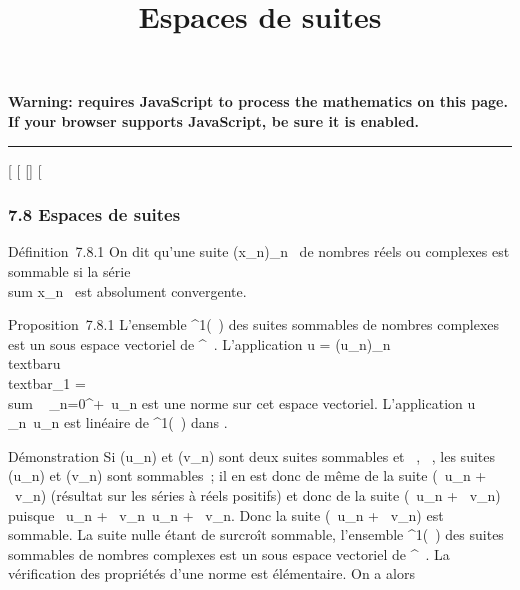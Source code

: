 \documentclass[]{article}
\title{Espaces de suites}
\author{}
\date{}
\begin{document}
\maketitle

\textbf{Warning: 
requires JavaScript to process the mathematics on this page.\\ If your
browser supports JavaScript, be sure it is enabled.}

\begin{center}\rule{3in}{0.4pt}\end{center}

{[}
{[}
{[}{]}
{[}

\subsubsection{7.8 Espaces de suites}

Définition~7.8.1 On dit qu'une suite (x\_n)\_n\in{}~ de
nombres réels ou complexes est sommable si la série
\\sum  x\_n~ est
absolument convergente.

Proposition~7.8.1 L'ensemble \ell^1(~) des suites sommables de
nombres complexes est un sous espace vectoriel de ^~.
L'application u =
(u\_n)\_n\in{}~\mapsto~\\textbar{}u\\textbar{}\_1
= \\sum ~
\_n=0^+\infty~\textbar{}u\_n\textbar{} est une norme sur
cet espace vectoriel. L'application
u\mapsto~\\\sum
 \_n\in{}~u\_n est linéaire de \ell^1(~) dans .

Démonstration Si (u\_n) et (v\_n) sont deux suites
sommables et \alpha~,\beta~ \in {}, les suites (\textbar{}u\_n\textbar{}) et
(\textbar{}v\_n\textbar{}) sont sommables~; il en est donc de
même de la suite (\textbar{}\alpha~\textbar{}\textbar{}u\_n\textbar{}
+ \textbar{}\beta~\textbar{}\textbar{}v\_n\textbar{}) (résultat sur
les séries à réels positifs) et donc de la suite
(\textbar{}\alpha~u\_n + \beta~v\_n\textbar{}) puisque
\textbar{}\alpha~u\_n +
\beta~v\_n\textbar{}\leq\textbar{}\alpha~\textbar{}\textbar{}u\_n\textbar{}
+ \textbar{}\beta~\textbar{}\textbar{}v\_n\textbar{}. Donc la suite
(\alpha~u\_n + \beta~v\_n) est sommable. La suite nulle étant de
surcroît sommable, l'ensemble \ell^1(~) des suites sommables de
nombres complexes est un sous espace vectoriel de ^~. La
vérification des propriétés d'une norme est élémentaire. On a alors
\end{document}
